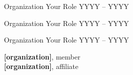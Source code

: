 \begin{cvhonors}
  \cvhonor
    {Organization} %
    {Your Role} %
    {} %
    {YYYY -- YYYY} %

  \cvhonor
    {Organization} %
    {Your Role} %
    {} %
    {YYYY -- YYYY} %
    
  \cvhonor
    {Organization} %
    {Your Role} %
    {} %
    {YYYY -- YYYY} %
\end{cvhonors}

\begin{small} \color{black}

\textbf{[organization]}, member  \\
\textbf{[organization]}, affiliate \\
\end{small}





